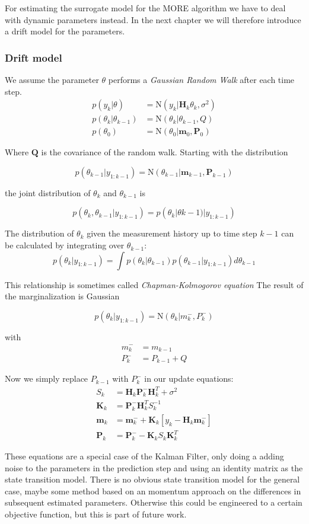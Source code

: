 For estimating the surrogate model for the MORE algorithm we have to
deal with dynamic parameters instead. In the next chapter we will therefore
introduce a drift model for the parameters.

\subsubsection{Drift model}
We assume the parameter $\theta$ performs a \textit{Gaussian Random Walk} after
each time step.
\begin{align}
  p(y_k | \theta) &= \text{N}(y_k | \mathbf{H}_k \theta_k, \sigma^2) \\
  p(\theta_k | \theta_{k-1}) &= \text{N} (\theta_k | \theta_{k-1}, Q) \\
  p(\theta_0) &= \text{N}(\theta_0 | \mathbf{m}_0, \mathbf{P}_0)
\end{align}

Where $\mathbf{Q}$ is the covariance of the random walk. 
Starting with the distribution

$$ p(\theta_{k-1} | y_{1:k-1})
= \text{N}(\theta_{k-1} | \mathbf{m}_{k-1}, \mathbf{P}_{k-1}) $$

the joint distribution of $\theta_k$ and $\theta_{k-1}$ is

$$ p(\theta_k, \theta_{k-1} | y_{1:k-1})
= p(\theta_k | \theta{k-1}) | y_{1:k-1})
$$

The distribution of $\theta_k$ given the measurement history up to time
step $k - 1$ can be calculated by integrating over
$\theta_{k-1}$:
$$ p(\theta_k | y_{1:k-1})
= \int p(\theta_k | \theta_{k-1}) p(\theta_{k-1} | y_{1:k-1}) d\theta_{k-1}
$$

This relationship is sometimes called \textit{Chapman-Kolmogorov equation}
The result of the marginalization is Gaussian

$$ p(\theta_k | y_{1:k-1}) = \text{N}(\theta_k | m_k^{-}, P_k^{-}) $$

with
\begin{align}
  m_k^{-} &= m_{k-1} \\
  P_k^{-} &= P_{k-1} + Q
\end{align}

Now we simply replace $P_{k-1}$ with $P_k^{-}$ in our update equations:
\begin{align*}
     S_k &= \textbf{H}_k \textbf{P}_{k}^{-} \textbf{H}^T_k + \sigma^2 \\
     \textbf{K}_k &= \textbf{P}_{k}^{-} \textbf{H}^T_k S_k^{-1} \\
     \textbf{m}_k &= \textbf{m}_{k}^{-} + \textbf{K}_k [y_k - \textbf{H}_k \textbf{m}_{k}^{-}] \\
     \textbf{P}_k &= \textbf{P}_{k}^{-} - \textbf{K}_k S_k \textbf{K}_k^T
\end{align*}


These equations are a special case of the Kalman Filter, only doing
a adding noise to the parameters in the prediction step and using
an identity matrix as the state transition model. There is no
obvious state transition model for the general case, maybe some
method based on an momentum approach on the differences in subsequent
estimated parameters. Otherwise this could be engineered to a certain
objective function, but this is part of future work.